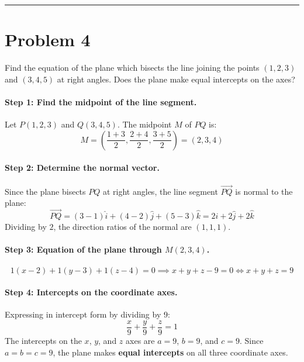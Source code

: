\documentclass[11pt,a4paper]{article}
\begin{document}
\vspace{0.4cm}
\hrule
\vspace{0.4cm}

\section{Problem 4}
\begin{problembox}[Problem 4]
Find the equation of the plane which bisects the line joining the points $(1, 2, 3)$ and $(3, 4, 5)$ at right angles. Does the plane make equal intercepts on the axes?
\end{problembox}

\paragraph{Step 1: Find the midpoint of the line segment.}
Let $P(1, 2, 3)$ and $Q(3, 4, 5)$. The midpoint $M$ of $PQ$ is:
$$M = \left(\frac{1 + 3}{2}, \frac{2 + 4}{2}, \frac{3 + 5}{2}\right) = (2, 3, 4)$$

\paragraph{Step 2: Determine the normal vector.}
Since the plane bisects $PQ$ at right angles, the line segment $\vec{PQ}$ is normal to the plane:
$$\vec{PQ} = (3 - 1)\hat{i} + (4 - 2)\hat{j} + (5 - 3)\hat{k} = 2\hat{i} + 2\hat{j} + 2\hat{k}$$
Dividing by $2$, the direction ratios of the normal are $(1, 1, 1)$.

\paragraph{Step 3: Equation of the plane through $M(2, 3, 4)$.}
$$1(x - 2) + 1(y - 3) + 1(z - 4) = 0 \implies x + y + z - 9 = 0 \iff x + y + z = 9$$

\paragraph{Step 4: Intercepts on the coordinate axes.}
Expressing in intercept form by dividing by $9$:
$$\frac{x}{9} + \frac{y}{9} + \frac{z}{9} = 1$$
The intercepts on the $x$, $y$, and $z$ axes are $a = 9$, $b = 9$, and $c = 9$.
Since $a = b = c = 9$, the plane makes \textbf{equal intercepts} on all three coordinate axes.
\end{document}
